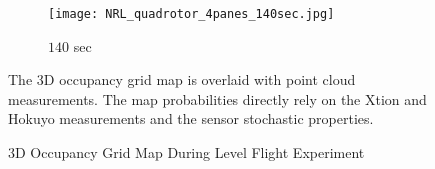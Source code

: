 \begin{figure}[!t]
{\begin{subfigure}[t]{0.4\columnwidth}
           	\centering
          	\texttt{[image: NRL\_quadrotor\_4panes\_140sec.jpg]}
        		\caption{$140$ sec}
    	\end{subfigure}
}
	\caption{3D Occupancy Grid Map During Level Flight Experiment}
	\medskip
	\small
	The 3D occupancy grid map is overlaid with point cloud measurements. The map probabilities directly rely on the Xtion and Hokuyo measurements and the sensor stochastic properties.
	\label{fig:exp3DMap}
\end{figure}



